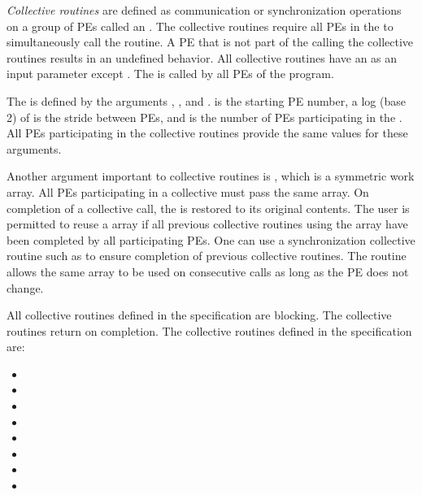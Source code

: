 \emph{Collective routines} are defined as communication or synchronization
operations on a group of \acp{PE} called an \activeset. The collective
routines require all \acp{PE} in the \activeset to simultaneously call the
routine.  A \ac{PE} that is not part of the \activeset calling the collective
routines results in an undefined behavior.  All collective routines have an
\activeset as an input parameter except \barrierall. The \barrierall is
called by all \acp{PE} of the \openshmem program. 

The \activeset is defined by the arguments , ,
and .   is the starting \ac{PE} number, a log (base
2) of  is the stride between \acp{PE}, and  is
the number of \acp{PE} participating in the \activeset.  All \acp{PE}
participating in the collective routines provide the same values for these
arguments. 
 
Another argument important to collective routines is , which is a
symmetric work array.  All \acp{PE} participating in a collective must pass the
same  array.  On completion of a collective call, the  is
restored to its original contents.  The user is permitted to reuse a 
array if all previous collective routines using the  array have been
completed by all participating \acp{PE}.  One can use a synchronization
collective routine such as \barrier to ensure completion of previous collective
routines. The  routine allows the same  array to
be used on consecutive calls as long as the \ac{PE} \activeset does not change. 

All collective routines defined in the specification are blocking.  The
collective routines return on completion.  The collective routines defined in
the \openshmem specification are:

\begin{itemize}
\item[] \broadcast 
\item[] \barrier
\item[] \barrierall
\item[] \collect
\item[] \reduction
\item[] 
\item[] 
\item[] 
\end{itemize} 

